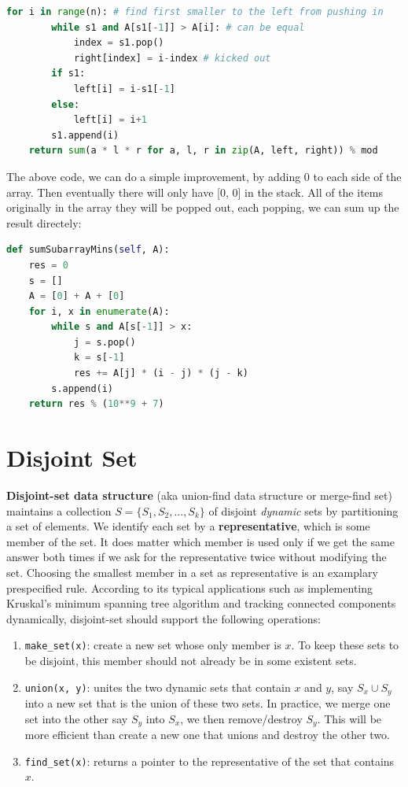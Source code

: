 \documentclass[../main.tex]{subfiles}
\begin{document}
\begin{examples}[resume]
\begin{lstlisting}[language=Python]
    for i in range(n): # find first smaller to the left from pushing in
        while s1 and A[s1[-1]] > A[i]: # can be equal
            index = s1.pop()
            right[index] = i-index # kicked out
        if s1:
            left[i] = i-s1[-1]
        else:
            left[i] = i+1
        s1.append(i)
    return sum(a * l * r for a, l, r in zip(A, left, right)) % mod
\end{lstlisting}
The above code, we can do a simple improvement, by adding 0 to each side of the array. Then eventually there will only have [0, 0] in the stack. All of the items originally in the array they will be popped out, each popping, we can sum up the result directely:
\begin{lstlisting}[language=Python]
def sumSubarrayMins(self, A):
    res = 0
    s = []
    A = [0] + A + [0]
    for i, x in enumerate(A):
        while s and A[s[-1]] > x:
            j = s.pop()
            k = s[-1]
            res += A[j] * (i - j) * (j - k)
        s.append(i)
    return res % (10**9 + 7)
\end{lstlisting}
\end{examples}
\section{Disjoint Set}
\textbf{Disjoint-set data structure} (aka union-find data structure or merge-find set) maintains a collection $S = \{S_1, S_2, ..., S_k\}$ of disjoint \textit{dynamic} sets by partitioning a set of elements. We identify each set by a \textbf{representative}, which is some member of the set. It does matter which member is used only if we get the same answer both times if we ask for the representative twice without modifying the set. Choosing the smallest member in a set as representative is an examplary prespecified rule. According to its typical applications such as implementing Kruskal's minimum spanning tree algorithm and tracking connected components dynamically, disjoint-set should support the following operations:
\begin{enumerate}
    \item \texttt{make\_set(x)}: create a new set whose only member is $x$. To keep these sets to be disjoint, this member should not already be in some existent sets.
    \item \texttt{union(x, y)}: unites the two dynamic sets that contain $x$ and $y$, say $S_x \cup  S_y$ into a new set that is the union of these two sets. In practice, we merge one set into the other say $S_y$ into $S_x$, we then remove/destroy $S_y$. This will be more efficient than create a new one that unions and destroy the other two. 
    \item \texttt{find\_set(x)}: returns a pointer to the representative of the set that contains $x$.

\end{enumerate}
\end{document}
